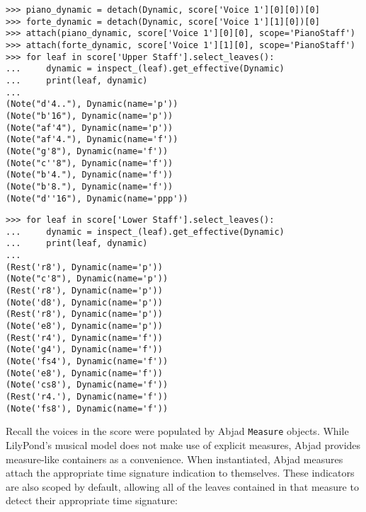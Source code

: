 \begin{abjadbookoutput}
\begin{singlespacing}
\vspace{-0.5\baselineskip}
\begin{lstlisting}
>>> piano_dynamic = detach(Dynamic, score['Voice 1'][0][0])[0]
>>> forte_dynamic = detach(Dynamic, score['Voice 1'][1][0])[0]
>>> attach(piano_dynamic, score['Voice 1'][0][0], scope='PianoStaff')
>>> attach(forte_dynamic, score['Voice 1'][1][0], scope='PianoStaff')
>>> for leaf in score['Upper Staff'].select_leaves():
...     dynamic = inspect_(leaf).get_effective(Dynamic)
...     print(leaf, dynamic)
...
(Note("d'4.."), Dynamic(name='p'))
(Note("b'16"), Dynamic(name='p'))
(Note("af'4"), Dynamic(name='p'))
(Note("af'4."), Dynamic(name='f'))
(Note("g'8"), Dynamic(name='f'))
(Note("c''8"), Dynamic(name='f'))
(Note("b'4."), Dynamic(name='f'))
(Note("b'8."), Dynamic(name='f'))
(Note("d''16"), Dynamic(name='ppp'))
\end{lstlisting}
\begin{lstlisting}
>>> for leaf in score['Lower Staff'].select_leaves():
...     dynamic = inspect_(leaf).get_effective(Dynamic)
...     print(leaf, dynamic)
...
(Rest('r8'), Dynamic(name='p'))
(Note("c'8"), Dynamic(name='p'))
(Rest('r8'), Dynamic(name='p'))
(Note('d8'), Dynamic(name='p'))
(Rest('r8'), Dynamic(name='p'))
(Note('e8'), Dynamic(name='p'))
(Rest('r4'), Dynamic(name='f'))
(Note('g4'), Dynamic(name='f'))
(Note('fs4'), Dynamic(name='f'))
(Note('e8'), Dynamic(name='f'))
(Note('cs8'), Dynamic(name='f'))
(Rest('r4.'), Dynamic(name='f'))
(Note('fs8'), Dynamic(name='f'))
\end{lstlisting}
\end{singlespacing}
\end{abjadbookoutput}

\noindent Recall the voices in the score were populated by Abjad
\texttt{Measure} objects. While LilyPond's musical model does not make use of
explicit measures, Abjad provides measure-like containers as a convenience.
When instantiated, Abjad measures attach the appropriate time signature
indication to themselves. These indicators are also scoped by default, allowing
all of the leaves contained in that measure to detect their appropriate time
signature:

\begin{comment}
<abjad>
measure_1 = score['Voice 1'][0]
measure_2 = score['Voice 1'][1]
inspect_(measure_1).get_indicator(TimeSignature)
for leaf in measure_1.select_leaves():
    time_signature = inspect_(leaf).get_effective(TimeSignature)
    print(leaf, time_signature)

inspect_(measure_2).get_indicator(TimeSignature)
for leaf in measure_2.select_leaves():
    time_signature = inspect_(leaf).get_effective(TimeSignature)
    print(leaf, time_signature)

</abjad>
\end{comment}

